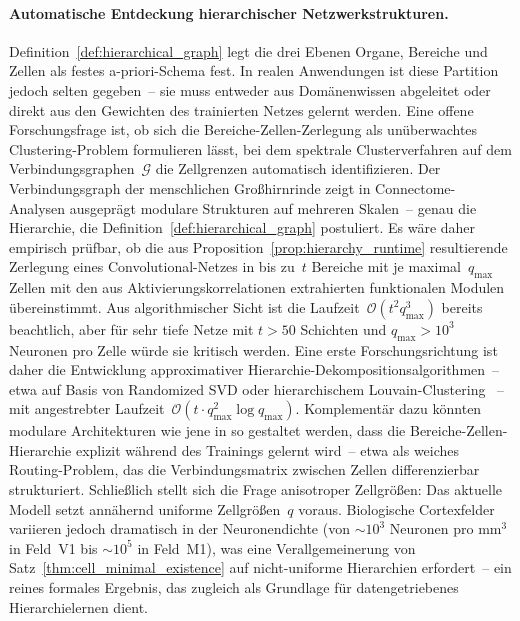\documentclass[12pt, a4paper, openany]{report}
\newcommand{\calG}{\mathcal{G}}
\begin{document}
\paragraph{Automatische Entdeckung hierarchischer Netzwerkstrukturen.}
Definition~\ref{def:hierarchical_graph} legt die drei Ebenen Organe,
Bereiche und Zellen als festes a-priori-Schema fest.  In realen
Anwendungen ist diese Partition jedoch selten gegeben~-- sie muss entweder
aus Domänenwissen abgeleitet oder direkt aus den Gewichten des trainierten
Netzes gelernt werden.  Eine offene Forschungsfrage ist, ob sich die
Bereiche-Zellen-Zerlegung als unüberwachtes Clustering-Problem formulieren
lässt, bei dem spektrale Clusterverfahren auf dem Verbindungsgraphen~$\calG$
die Zellgrenzen automatisch identifizieren.
Der Verbindungsgraph der menschlichen Großhirnrinde zeigt in Connectome-
Analysen \cite{sporns05} ausgeprägt modulare Strukturen auf mehreren
Skalen~-- genau die Hierarchie, die Definition~\ref{def:hierarchical_graph}
postuliert.  Es wäre daher empirisch prüfbar, ob die aus
Proposition~\ref{prop:hierarchy_runtime} resultierende Zerlegung eines
Convolutional-Netzes in bis zu~$t$ Bereiche mit je maximal~$q_{\max}$ Zellen
mit den aus Aktivierungskorrelationen extrahierten funktionalen Modulen übereinstimmt.
Aus algorithmischer Sicht ist die Laufzeit~$\mathcal{O}(t^2 q_{\max}^3)$
bereits beachtlich, aber für sehr tiefe Netze mit $t > 50$ Schichten und
$q_{\max} > 10^3$ Neuronen pro Zelle würde sie kritisch werden.  Eine erste
Forschungsrichtung ist daher die Entwicklung approximativer
Hierarchie-Dekompositionsalgorithmen~-- etwa auf Basis von Randomized SVD
oder hierarchischem Louvain-Clustering \cite{barabasi99}~-- mit angestrebter
Laufzeit~$\mathcal{O}(t \cdot q_{\max}^2 \log q_{\max})$.  Komplementär
dazu könnten modulare Architekturen wie jene in \cite{goyal22} so gestaltet
werden, dass die Bereiche-Zellen-Hierarchie explizit während des Trainings
gelernt wird~-- etwa als weiches Routing-Problem, das die Verbindungsmatrix
zwischen Zellen differenzierbar strukturiert.
Schließlich stellt sich die Frage anisotroper Zellgrößen: Das aktuelle Modell
setzt annähernd uniforme Zellgrößen~$q$ voraus.  Biologische Cortexfelder
variieren jedoch dramatisch in der Neuronendichte (von $\sim\!10^3$ Neuronen
pro mm$^3$ in Feld~V1 bis $\sim\!10^5$ in Feld~M1), was eine Verallgemeinerung
von Satz~\ref{thm:cell_minimal_existence} auf nicht-uniforme Hierarchien
erfordert~-- ein reines formales Ergebnis, das zugleich als Grundlage für
datengetriebenes Hierarchielernen dient.
\end{document}
